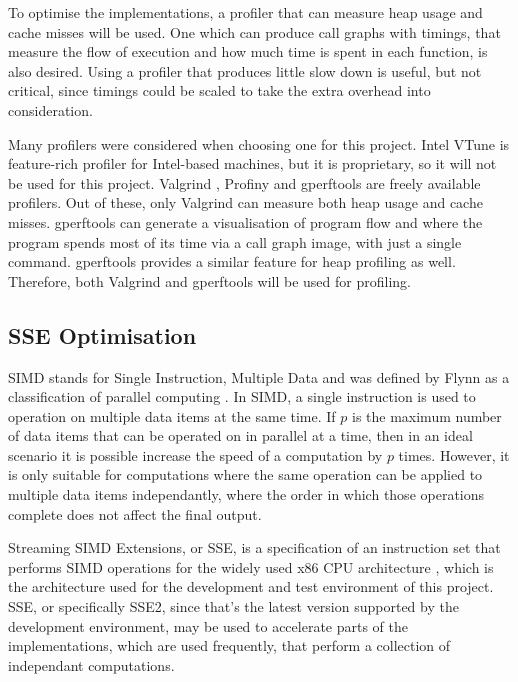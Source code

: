 To optimise the implementations, a profiler that can measure heap usage and cache misses will be used. One which can produce call graphs with timings, that measure the flow of execution and how much time is spent in each function, is also desired. Using a profiler that produces little slow down is useful, but not critical, since timings could be scaled to take the extra overhead into consideration. 

Many profilers were considered when choosing one for this project. Intel VTune \cite{intel-vtune} is feature-rich profiler for Intel-based machines, but it is proprietary, so it will not be used for this project. Valgrind \cite{valgrind}, Profiny \cite{profiny} and gperftools \cite{gperftools} are freely available profilers. Out of these, only Valgrind can measure both heap usage and cache misses. gperftools can generate a visualisation of program flow and where the program spends most of its time via a call graph image, with just a single command. gperftools provides a similar feature for heap profiling as well. Therefore, both Valgrind and gperftools will be used for profiling.

\subsection{SSE Optimisation}
\label{sec:sse}

SIMD stands for Single Instruction, Multiple Data and was defined by Flynn as a classification of parallel computing \cite{flynns-taxonomy}. In SIMD, a single instruction is used to operation on multiple data items at the same time. If $p$ is the maximum number of data items that can be operated on in parallel at a time, then in an ideal scenario it is possible increase the speed of a computation by $p$ times. However, it is only suitable for computations where the same operation can be applied to multiple data items independantly, where the order in which those operations complete does not affect the final output.

Streaming SIMD Extensions, or SSE, is a specification of an instruction set that performs SIMD operations for the widely used x86 CPU architecture \cite{sse}, which is the architecture used for the development and test environment of this project. SSE, or specifically SSE2, since that's the latest version supported by the development environment, may be used to accelerate parts of the implementations, which are used frequently, that perform a collection of independant computations.